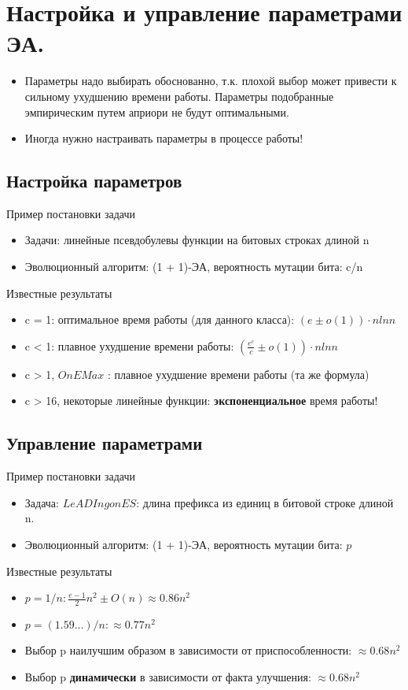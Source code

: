 \section{Настройка и управление параметрами ЭА.}

\begin{itemize}
    \item Параметры надо выбирать обоснованно, т.к. плохой выбор может привести к сильному ухудшению времени работы. Параметры подобранные эмпирическим путем априори не будут оптимальными.
    \item Иногда нужно настраивать параметры в процессе работы!
\end{itemize}

\subsection*{Настройка параметров}
Пример постановки задачи
\begin{itemize}
    \item Задачи: линейные псевдобулевы функции на битовых строках длиной n 
    \item Эволюционный алгоритм: (1 + 1)-ЭА, вероятность мутации бита: c/n
\end{itemize}


Известные результаты
\begin{itemize}
    \item c = 1: оптимальное время работы (для данного класса): $(e ± o(1)) · n ln n $
    \item c < 1: плавное ухудшение времени работы: $( \frac{e^c}{c} ± o(1)) · n ln n$
    \item c > 1, $OnEMax$ : плавное ухудшение времени работы (та же формула)
    \item c > 16, некоторые линейные функции: \textbf{экспоненциальное} время работы! 
\end{itemize}


\subsection*{Управление параметрами}
Пример постановки задачи
\begin{itemize}
    \item Задача: $LeADIngonES$: длина префикса из единиц в битовой строке длиной n.
    \item Эволюционный алгоритм: (1 + 1)-ЭА, вероятность мутации бита: $p$
\end{itemize}


Известные результаты
\begin{itemize}
    \item $p = 1/n: \frac{e-1}{2} n^2 ± O(n) \approx 0.86n^2$
    \item $p = (1.59...)/n: \approx 0.77n^2$
    \item Выбор p наилучшим образом в зависимости от приспособленности: \textbf{$\approx 0.68n^2$}
    \item Выбор p \textbf{динамически} в зависимости от факта улучшения: \textbf{$\approx 0.68n^2$}
\end{itemize}
    